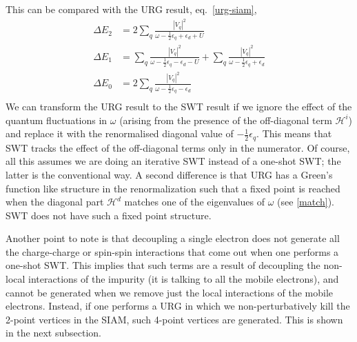 This can be compared with the URG result, eq.~\ref{urg-siam},
\begin{equation}\begin{aligned}
\Delta E_2 &= 2\sum_{q}\frac{|V_q|^2}{\omega - \frac{1}{2}\epsilon_q + \epsilon_d + U}\\
\Delta E_1 &= \sum_{q}\frac{|V_q|^2}{\omega - \frac{1}{2}\epsilon_q - \epsilon_d - U} + \sum_{q}\frac{|V_q|^2}{\omega - \frac{1}{2}\epsilon_q + \epsilon_d}\\
\Delta E_0 &= 2\sum_{q}\frac{|V_q|^2}{\omega - \frac{1}{2}\epsilon_q - \epsilon_d}\\
\end{aligned}\end{equation}
We can transform the URG result to the SWT result if we ignore the effect of the quantum fluctuations in \(\omega\) (arising from the presence of the off-diagonal term \(\mathcal{H}^i\)) and replace it with the renormalised diagonal value of \(-\frac{1}{2}\epsilon_q\). This means that SWT tracks the effect of the off-diagonal terms only in the numerator. Of course, all this assumes we are doing an iterative SWT instead of a one-shot SWT; the latter is the conventional way. A second difference is that URG has a Green's function like structure in the renormalization such that a fixed point is reached when the diagonal part \(\mathcal{H}^d\) matches one of the eigenvalues of \(\omega\) (see \ref{match}). SWT does not have such a fixed point structure.

Another point to note is that decoupling a single electron does not generate all the charge-charge or spin-spin interactions that come out when one performs a one-shot SWT. This implies that such terms are a result of decoupling the non-local interactions of the impurity (it is talking to all the mobile electrons), and cannot be generated when we remove just the local interactions of the mobile electrons. Instead, if one performs a URG in which we non-perturbatively kill the 2-point vertices in the SIAM, such 4-point vertices are generated. This is shown in the next subsection.
